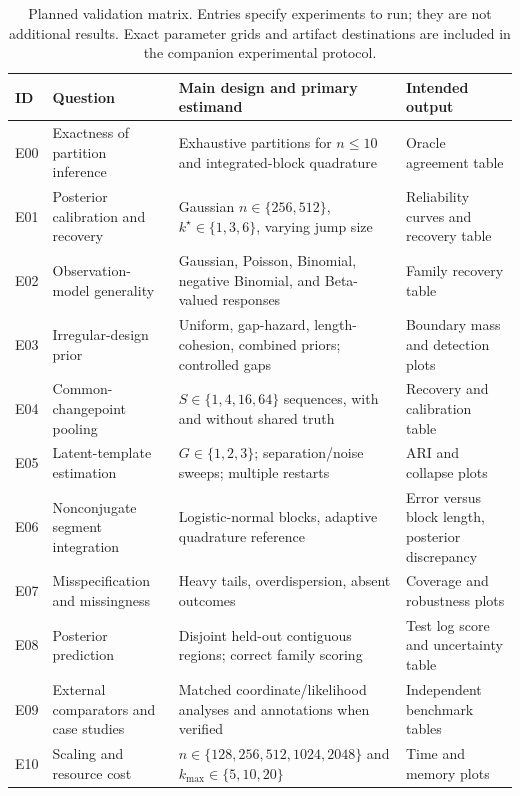 \begin{table}[!htbp]
\centering\small
\caption{Planned validation matrix. Entries specify experiments to run; they are
not additional results. Exact parameter grids and artifact destinations are
included in the companion experimental protocol.}
\label{tab:planned-experiment-matrix}
\begin{tabularx}{0.98\textwidth}{@{}L{0.07\textwidth}L{0.28\textwidth}Y L{0.21\textwidth}@{}}
\toprule
ID & Question & Main design and primary estimand & Intended output \\
\midrule
E00 & Exactness of partition inference & Exhaustive partitions for $n\le10$ and integrated-block quadrature & Oracle agreement table \\
E01 & Posterior calibration and recovery & Gaussian $n\in\{256,512\}$, $k^\star\in\{1,3,6\}$, varying jump size & Reliability curves and recovery table \\
E02 & Observation-model generality & Gaussian, Poisson, Binomial, negative Binomial, and Beta-valued responses & Family recovery table \\
E03 & Irregular-design prior & Uniform, gap-hazard, length-cohesion, combined priors; controlled gaps & Boundary mass and detection plots \\
E04 & Common-changepoint pooling & $S\in\{1,4,16,64\}$ sequences, with and without shared truth & Recovery and calibration table \\
E05 & Latent-template estimation & $G\in\{1,2,3\}$; separation/noise sweeps; multiple restarts & ARI and collapse plots \\
E06 & Nonconjugate segment integration & Logistic-normal blocks, adaptive quadrature reference & Error versus block length, posterior discrepancy \\
E07 & Misspecification and missingness & Heavy tails, overdispersion, absent outcomes & Coverage and robustness plots \\
E08 & Posterior prediction & Disjoint held-out contiguous regions; correct family scoring & Test log score and uncertainty table \\
E09 & External comparators and case studies & Matched coordinate/likelihood analyses and annotations when verified & Independent benchmark tables \\
E10 & Scaling and resource cost & $n\in\{128,256,512,1024,2048\}$ and $k_{\max}\in\{5,10,20\}$ & Time and memory plots \\
\bottomrule
\end{tabularx}
\end{table}

